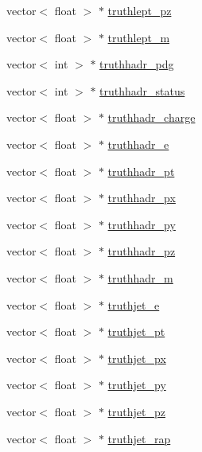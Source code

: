 \begin{DoxyCompactItemize}
vector$<$ float $>$ $\ast$ \hyperlink{classXMLWriter_a84fd4718dc5b166fbe744401789f1ea0}{truthlept\+\_\+pz}
\item 
vector$<$ float $>$ $\ast$ \hyperlink{classXMLWriter_af2cc3d4e76513642c30d36481fb961f7}{truthlept\+\_\+m}
\item 
vector$<$ int $>$ $\ast$ \hyperlink{classXMLWriter_ae00a8d61de0646bbff8dd6784bc244b4}{truthhadr\+\_\+pdg}
\item 
vector$<$ int $>$ $\ast$ \hyperlink{classXMLWriter_af0066b859ac45e5bbb08b83f3f91d89c}{truthhadr\+\_\+status}
\item 
vector$<$ float $>$ $\ast$ \hyperlink{classXMLWriter_a07426ccab7e20fc3affea801e910aab3}{truthhadr\+\_\+charge}
\item 
vector$<$ float $>$ $\ast$ \hyperlink{classXMLWriter_a89f970777d194bfbb1f37a21560cb3bd}{truthhadr\+\_\+e}
\item 
vector$<$ float $>$ $\ast$ \hyperlink{classXMLWriter_abb3adc65b5ef04650111bbc79053bfa9}{truthhadr\+\_\+pt}
\item 
vector$<$ float $>$ $\ast$ \hyperlink{classXMLWriter_a91f917b7fc699467884f8ca945c1ad6f}{truthhadr\+\_\+px}
\item 
vector$<$ float $>$ $\ast$ \hyperlink{classXMLWriter_a605bc2491a48d969a6d3750833cca945}{truthhadr\+\_\+py}
\item 
vector$<$ float $>$ $\ast$ \hyperlink{classXMLWriter_a32c70161fc9849f4603ca2c6ec740ca7}{truthhadr\+\_\+pz}
\item 
vector$<$ float $>$ $\ast$ \hyperlink{classXMLWriter_a73ac43c5cda48d5060238cd05465cd04}{truthhadr\+\_\+m}
\item 
vector$<$ float $>$ $\ast$ \hyperlink{classXMLWriter_a57d4e6cbec226a74027cec6a1cf3fb74}{truthjet\+\_\+e}
\item 
vector$<$ float $>$ $\ast$ \hyperlink{classXMLWriter_a7ec5a8bcf98f07752e6fa97e7a941536}{truthjet\+\_\+pt}
\item 
vector$<$ float $>$ $\ast$ \hyperlink{classXMLWriter_a6de83e3889bf28bea0151d37ea7dc9fa}{truthjet\+\_\+px}
\item 
vector$<$ float $>$ $\ast$ \hyperlink{classXMLWriter_ada54fce3b87afe4fd79a689bdb21376e}{truthjet\+\_\+py}
\item 
vector$<$ float $>$ $\ast$ \hyperlink{classXMLWriter_ab24fb4267199b17f03e4d9105533cb01}{truthjet\+\_\+pz}
\item 
vector$<$ float $>$ $\ast$ \hyperlink{classXMLWriter_ae84fc61041ed4b7f3967b4ae077beeb8}{truthjet\+\_\+rap}
\item 

\end{DoxyCompactItemize}
